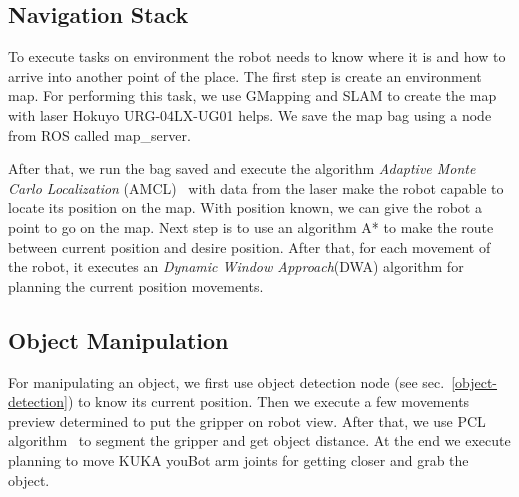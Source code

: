 \subsection{Navigation Stack}\label{navigation}
To execute tasks on environment the robot needs to know where it is and how to arrive into another point of the place. The first step is create an environment map. For performing this task, we use GMapping and SLAM to create the map with laser Hokuyo URG-04LX-UG01 helps. We save the map bag using a node from ROS called map\_server.

After that, we run the bag saved and execute the algorithm \emph{Adaptive Monte Carlo Localization} (AMCL)~\cite{fox:1999} with data from the laser make the robot capable to locate its position on the map. With position known, we can give the robot a point to go on the map. Next step is to use an algorithm A* to make the route between current position and desire position. After that, for each movement of the robot, it executes an \emph{Dynamic Window Approach}(DWA) algorithm for planning the current position movements.

\subsection{Object Manipulation}\label{manipulation}
For manipulating an object, we first use object detection node (see sec.~\ref{object-detection}) to know its current position. Then we execute a few movements preview determined to put the gripper on robot view. After that, we use PCL algorithm~\cite{aldoma:2012} to segment the gripper and get object distance. At the end we execute planning to move KUKA youBot arm joints for getting closer and grab the object.
